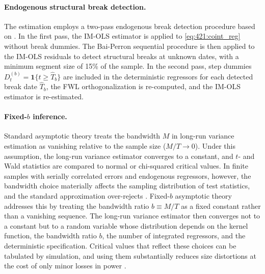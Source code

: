 \paragraph{Endogenous structural break detection.}
The estimation employs a two-pass endogenous break detection
procedure based on \citet{BaiPerron2003}. In the first pass, the
IM-OLS estimator is applied to \eqref{eq:421:coint_reg} without
break dummies. The Bai-Perron sequential procedure is then applied
to the IM-OLS residuals to detect structural breaks at unknown
dates, with a minimum segment size of 15\% of the sample. In the
second pass, step dummies $D_t^{(b)} = \mathbf{1}\{t \geq
\hat{T}_b\}$ are included in the deterministic regressors for each
detected break date $\hat{T}_b$, the FWL orthogonalization is
re-computed, and the IM-OLS estimator is re-estimated.

\paragraph{Fixed-$b$ inference.}
Standard asymptotic theory treats the bandwidth $M$ in long-run
variance estimation as vanishing relative to the sample size
($M/T \to 0$). Under this assumption, the long-run variance
estimator converges to a constant, and $t$- and Wald statistics
are compared to normal or chi-squared critical values. In finite
samples with serially correlated errors and endogenous regressors,
however, the bandwidth choice materially affects the sampling
distribution of test statistics, and the standard approximation
over-rejects \citep{KieferVogelsang2005}. Fixed-$b$ asymptotic
theory addresses this by treating the bandwidth ratio
$b \equiv M/T$ as a fixed constant rather than a vanishing
sequence. The long-run variance estimator then converges not to a
constant but to a random variable whose distribution depends on
the kernel function, the bandwidth ratio $b$, the number of
integrated regressors, and the deterministic specification.
Critical values that reflect these choices can be tabulated by
simulation, and using them substantially reduces size distortions
at the cost of only minor losses in power
\citep{VogelsangWagner2014}.

